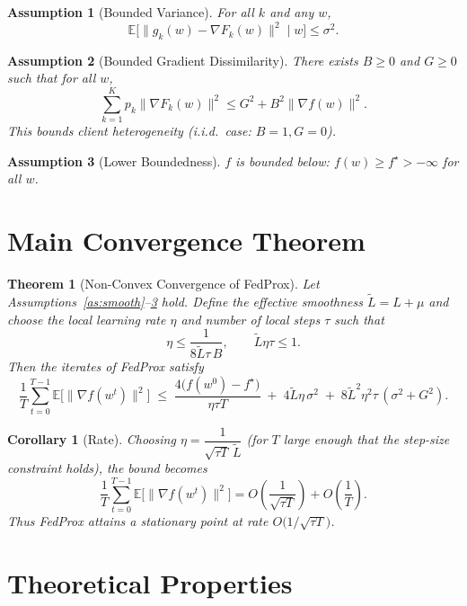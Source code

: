 \documentclass{article}
\newtheorem{theorem}{Theorem}
\newtheorem{assumption}{Assumption}
\newtheorem{corollary}{Corollary}
\begin{document}
\begin{assumption}[Bounded Variance]\label{as:var}
For all $k$ and any $w$,
\[
\mathbb{E}\big[\|g_k(w) - \nabla F_k(w)\|^2 \mid w\big] \le \sigma^2.
\]
\end{assumption}

\begin{assumption}[Bounded Gradient Dissimilarity]\label{as:diss}
There exists $B \ge 0$ and $G \ge 0$ such that for all $w$,
\[
\sum_{k=1}^{K} p_k \|\nabla F_k(w)\|^2 \le G^2 + B^2 \|\nabla f(w)\|^2 .
\]
This bounds client heterogeneity (i.i.d.\ case: $B=1, G=0$).
\end{assumption}

\begin{assumption}[Lower Boundedness]\label{as:lb}
$f$ is bounded below: $f(w) \ge f^\star > -\infty$ for all $w$.
\end{assumption}

\section*{Main Convergence Theorem}

\begin{theorem}[Non-Convex Convergence of FedProx]\label{thm:main}
Let Assumptions~\ref{as:smooth}--\ref{as:lb} hold. Define the effective smoothness $\tilde L = L + \mu$ and choose the local learning rate $\eta$ and number of local steps $\tau$ such that
\[
\eta \le \frac{1}{8 \tilde L \tau \, B}, \qquad \tilde L \eta \tau \le 1.
\]
Then the iterates of FedProx satisfy
\[
\frac{1}{T}\sum_{t=0}^{T-1} \mathbb{E}\big[\|\nabla f(w^t)\|^2\big]
\;\le\;
\frac{4\big(f(w^0) - f^\star\big)}{\eta \tau T}
\;+\; 4\tilde L \eta \,\sigma^2
\;+\; 8 \tilde L^2 \eta^2 \tau \,(\sigma^2 + G^2).
\]
\end{theorem}

\begin{corollary}[Rate]\label{cor:rate}
Choosing $\eta = \dfrac{1}{\sqrt{\tau T}\,\tilde L}$ (for $T$ large enough that the step-size constraint holds), the bound becomes
\[
\frac{1}{T}\sum_{t=0}^{T-1} \mathbb{E}\big[\|\nabla f(w^t)\|^2\big]
= O\!\left(\frac{1}{\sqrt{\tau T}}\right) + O\!\left(\frac{1}{T}\right).
\]
Thus FedProx attains a stationary point at rate $O\!\big(1/\sqrt{\tau T}\big)$.
\end{corollary}

\section*{Theoretical Properties}
\end{document}
